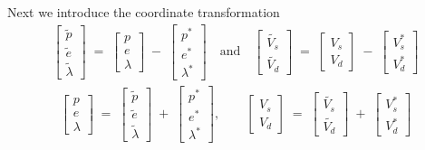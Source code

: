 Next we introduce the coordinate transformation
\begin{align*}
\begin{bmatrix}
    \tilde{p}\\
    \tilde{e}\\
    \tilde{\lambda}
\end{bmatrix} \;=\;
\begin{bmatrix}
    p\\
    e\\
    \lambda
\end{bmatrix} \;-\;
\begin{bmatrix}
    p^{\ast}\\
    e^{\ast}\\
    \lambda^{\ast}
\end{bmatrix} \quad \text{and} \quad
\begin{bmatrix}
    \tilde{V_s}\\
    \tilde{V_d}
\end{bmatrix} \;=\;
\begin{bmatrix}
    V_s\\
    V_d
\end{bmatrix}\;-\;
\begin{bmatrix}
    V_s^{\ast}\\
    V_d^{\ast}
\end{bmatrix}
\end{align*}
\begin{align*}
\begin{bmatrix}
    p\\
    e\\
    \lambda
\end{bmatrix} \;=\;
\begin{bmatrix}
    \tilde{p}\\
    \tilde{e}\\
    \tilde{\lambda}
\end{bmatrix} \;+\;
\begin{bmatrix}
    p^{\ast}\\
    e^{\ast}\\
    \lambda^{\ast}
\end{bmatrix},\qquad
\begin{bmatrix}
    V_s\\
    V_d
\end{bmatrix}\;=\;
\begin{bmatrix}
    \tilde{V_s}\\
    \tilde{V_d}
\end{bmatrix} \;+\;
\begin{bmatrix}
    V_s^{\ast}\\
    V_d^{\ast}
\end{bmatrix}
\end{align*}

